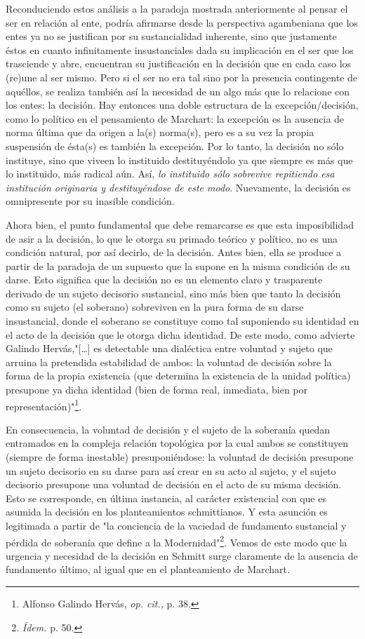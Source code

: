\documentclass{book}
\begin{document}
Reconduciendo estos análisis a la paradoja mostrada anteriormente al
pensar el ser en relación al ente, podría afirmarse desde la perspectiva
agambeniana que los entes ya no se justifican por su sustancialidad
inherente, sino que justamente éstos en cuanto infinitamente
insustanciales dada su implicación en el ser que los trasciende y abre,
encuentran su justificación en la decisión que en cada caso los (re)une
al ser mismo. Pero si el ser no era tal sino por la presencia
contingente de aquéllos, se realiza también así la necesidad de un algo
más que lo relacione con los entes: la decisión. Hay entonces una doble
estructura de la excepción/decisión, como lo político en el pensamiento
de Marchart: la excepción es la ausencia de norma última que da origen a
la(s) norma(s), pero es a su vez la propia suspensión de ésta(s) es
también la excepción. Por lo tanto, la decisión no sólo instituye, sino
que viveen lo instituido destituyéndolo ya que siempre es más que lo
instituido, más radical aún. Así, \emph{lo instituido sólo sobrevive
repitiendo esa institución originaria y destituyéndose de este modo}.
Nuevamente, la decisión es omnipresente por su inasible condición.

Ahora bien, el punto fundamental que debe remarcarse es que esta
imposibilidad de asir a la decisión, lo que le otorga su primado teórico
y político, no es una condición natural, por así decirlo, de la
decisión. Antes bien, ella se produce a partir de la paradoja de un
supuesto que la supone en la misma condición de su darse. Esto significa
que la decisión no es un elemento claro y trasparente derivado de un
sujeto decisorio sustancial, sino más bien que tanto la decisión como su
sujeto (el soberano) sobreviven en la pura forma de su darse
insustancial, donde el soberano se constituye como tal suponiendo su
identidad en el acto de la decisión que le otorga dicha identidad. De
este modo, como advierte Galindo Hervás,"{[}\ldots{]} es detectable una
dialéctica entre voluntad y sujeto que arruina la pretendida estabilidad
de ambos: la voluntad de decisión sobre la forma de la propia existencia
(que determina la existencia de la unidad política) presupone ya dicha
identidad (bien de forma real, inmediata, bien por
representación)"\footnote{Alfonso Galindo Hervás, \emph{op. cit.,} p.
  38.}.

En consecuencia, la voluntad de decisión y el sujeto de la soberanía
quedan entramados en la compleja relación topológica por la cual ambos
se constituyen (siempre de forma inestable) presuponiéndose: la voluntad
de decisión presupone un sujeto decisorio en su darse para así crear en
su acto al sujeto, y el sujeto decisorio presupone una voluntad de
decisión en el acto de su misma decisión. Esto se corresponde, en última
instancia, al carácter existencial con que es asumida la decisión en los
planteamientos schmittianos. Y esta asunción es legitimada a partir de
"la conciencia de la vaciedad de fundamento sustancial y pérdida de
soberanía que define a la Modernidad"\footnote{\emph{Ídem.} p. 50.}.
Vemos de este modo que la urgencia y necesidad de la decisión en Schmitt
surge claramente de la ausencia de fundamento último, al igual que en el
planteamiento de Marchart.
\end{document}
